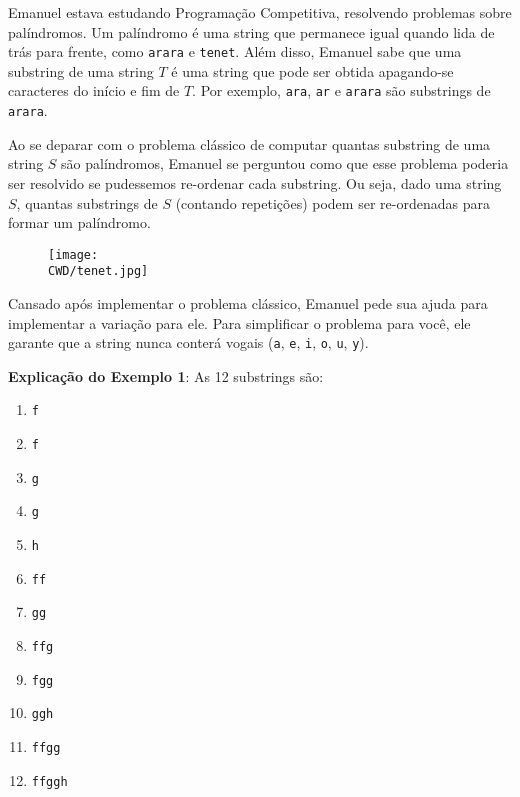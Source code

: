 %

Emanuel estava estudando Programação Competitiva, resolvendo problemas sobre palíndromos. Um palíndromo é uma string que permanece igual quando lida de trás para frente, como {\tt arara} e {\tt tenet}. Além disso, Emanuel sabe que uma substring de uma string $T$ é uma string que pode ser obtida apagando-se caracteres do início e fim de $T$. Por exemplo, {\tt ara}, {\tt ar} e {\tt arara} são substrings de {\tt arara}.

Ao se deparar com o problema clássico de computar quantas substring de uma string $S$ são palíndromos, Emanuel se perguntou como que esse problema poderia ser resolvido se pudessemos re-ordenar cada substring. Ou seja, dado uma string $S$, quantas substrings de $S$ (contando repetições) podem ser re-ordenadas para formar um palíndromo.

\begin{figure}[H]
    \centering
    \texttt{[image: \\CWD/tenet.jpg]}
\end{figure}

Cansado após implementar o problema clássico, Emanuel pede sua ajuda para implementar a variação para ele. Para simplificar o problema para você, ele garante que a string nunca conterá vogais ({\tt a}, {\tt e}, {\tt i}, {\tt o}, {\tt u}, {\tt y}).

%
%

%
%



\sampleio

\bigskip
\textbf{Explicação do Exemplo 1}: As 12 substrings são:

\begin{multicols}{2}
\begin{enumerate}
	\item {\tt f}
	\item {\tt f}
	\item {\tt g}
	\item {\tt g}
	\item {\tt h}
	\item {\tt ff}
	\item {\tt gg}
	\item {\tt ffg}
	\item {\tt fgg}
	\item {\tt ggh}
	\item {\tt ffgg}
	\item {\tt ffggh}
\end{enumerate}
\end{multicols}
